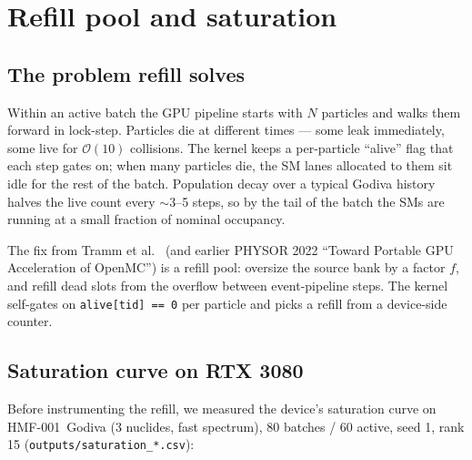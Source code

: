 \section{Refill pool and saturation}
\label{sec:refill}

\subsection{The problem refill solves}

Within an active batch the GPU pipeline starts with $N$ particles
and walks them forward in lock-step. Particles die at different
times --- some leak immediately, some live for $\mathcal{O}(10)$
collisions. The kernel keeps a per-particle ``alive'' flag that
each step gates on; when many particles die, the SM lanes
allocated to them sit idle for the rest of the batch. Population
decay over a typical Godiva history halves the live count every
$\sim$3--5 steps, so by the tail of the batch the SMs are running
at a small fraction of nominal occupancy.

The fix from Tramm et al.~\cite{tramm2024} (and earlier
PHYSOR 2022 ``Toward Portable GPU Acceleration of OpenMC'')
is a refill pool: oversize the source bank by a factor $f$,
and refill dead slots from the overflow between event-pipeline
steps. The kernel self-gates on
\texttt{alive[tid] == 0} per particle and picks a refill from a
device-side counter.

\subsection{Saturation curve on RTX 3080}

Before instrumenting the refill, we measured the device's
saturation curve on \mbox{HMF-001 Godiva} (3 nuclides, fast
spectrum), 80 batches / 60 active, seed 1, rank 15
(\texttt{outputs/saturation\_*.csv}):

\noindent{}

